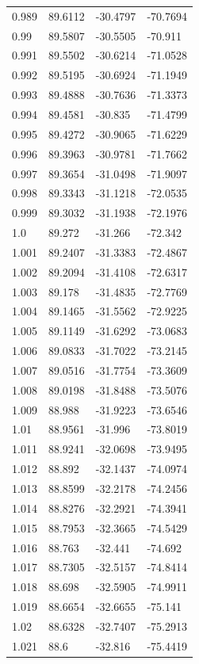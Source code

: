 \begin{tabular}{llll}
0.989 & 89.6112 & -30.4797 & -70.7694 \\
0.99 & 89.5807 & -30.5505 & -70.911 \\
0.991 & 89.5502 & -30.6214 & -71.0528 \\
0.992 & 89.5195 & -30.6924 & -71.1949 \\
0.993 & 89.4888 & -30.7636 & -71.3373 \\
0.994 & 89.4581 & -30.835 & -71.4799 \\
0.995 & 89.4272 & -30.9065 & -71.6229 \\
0.996 & 89.3963 & -30.9781 & -71.7662 \\
0.997 & 89.3654 & -31.0498 & -71.9097 \\
0.998 & 89.3343 & -31.1218 & -72.0535 \\
0.999 & 89.3032 & -31.1938 & -72.1976 \\
1.0 & 89.272 & -31.266 & -72.342 \\
1.001 & 89.2407 & -31.3383 & -72.4867 \\
1.002 & 89.2094 & -31.4108 & -72.6317 \\
1.003 & 89.178 & -31.4835 & -72.7769 \\
1.004 & 89.1465 & -31.5562 & -72.9225 \\
1.005 & 89.1149 & -31.6292 & -73.0683 \\
1.006 & 89.0833 & -31.7022 & -73.2145 \\
1.007 & 89.0516 & -31.7754 & -73.3609 \\
1.008 & 89.0198 & -31.8488 & -73.5076 \\
1.009 & 88.988 & -31.9223 & -73.6546 \\
1.01 & 88.9561 & -31.996 & -73.8019 \\
1.011 & 88.9241 & -32.0698 & -73.9495 \\
1.012 & 88.892 & -32.1437 & -74.0974 \\
1.013 & 88.8599 & -32.2178 & -74.2456 \\
1.014 & 88.8276 & -32.2921 & -74.3941 \\
1.015 & 88.7953 & -32.3665 & -74.5429 \\
1.016 & 88.763 & -32.441 & -74.692 \\
1.017 & 88.7305 & -32.5157 & -74.8414 \\
1.018 & 88.698 & -32.5905 & -74.9911 \\
1.019 & 88.6654 & -32.6655 & -75.141 \\
1.02 & 88.6328 & -32.7407 & -75.2913 \\
1.021 & 88.6 & -32.816 & -75.4419 \\

\end{tabular}
